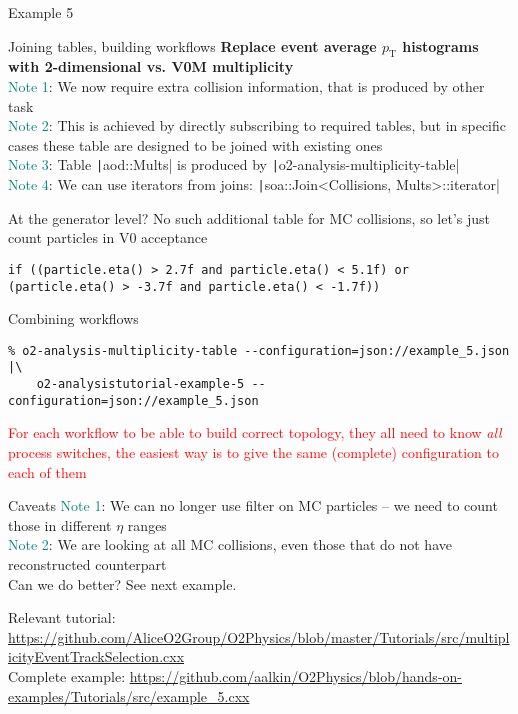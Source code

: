 \documentclass[10pt,lualatex,xcolor={table,svgnames},{hyperref={bookmarks=true,linktoc=all}},aspectratio=169]{beamer}
\newcommand{\programmatic}[1]{\textcolor{-green!40!yellow}{#1}}
\newcommand{\notion}[1]{\textcolor{teal}{#1}}
\newcommand{\codeline}[1]{{\texttt|#1|}}
\begin{document}
\begin{frame}{Example 5}
\begin{block}{Joining tables, building workflows}
\textbf{Replace event average $p_{\text{T}}$ histograms with 2-dimensional vs. V0M multiplicity}\\[1em]

\notion{Note 1}: We now require extra collision information, that is produced by other task \\
\notion{Note 2}: This is achieved by directly subscribing to required tables, but in specific cases these table are designed to be \programmatic{joined} with existing ones \\
\notion{Note 3}: Table \codeline{aod::Mults} is produced by \codeline{o2-analysis-multiplicity-table} \\
\notion{Note 4}: We can use iterators from joins: \codeline{soa::Join<Collisions, Mults>::iterator}
\end{block}

\begin{block}{At the generator level?}
No such additional table for MC collisions, so let's just count particles in V0 acceptance
\begin{verbatim}
if ((particle.eta() > 2.7f and particle.eta() < 5.1f) or (particle.eta() > -3.7f and particle.eta() < -1.7f))
\end{verbatim}
\end{block}
\framebreak
\begin{block}{Combining workflows}
\begin{verbatim}
% o2-analysis-multiplicity-table --configuration=json://example_5.json |\
    o2-analysistutorial-example-5 --configuration=json://example_5.json
\end{verbatim}

\textcolor{red}{For each workflow to be able to build correct topology, they all need to know \emph{all} process switches, the easiest way is to give the same (complete) configuration to each of them}
\vspace{0.2ex}
\end{block}
\begin{block}{Caveats}
\notion{Note 1}: We can no longer use filter on MC particles -- we need to count those in different $\eta$ ranges \\
\notion{Note 2}: We are looking at all MC collisions, even those that do not have reconstructed counterpart \\

Can we do better? See next example.
\end{block}

{\footnotesize Relevant tutorial:  \href{https://github.com/AliceO2Group/O2Physics/blob/master/Tutorials/src/multiplicityEventTrackSelection.cxx}{https://github.com/AliceO2Group/O2Physics/blob/master/Tutorials/src/multiplicityEventTrackSelection.cxx} \\
    Complete example: \href{https://github.com/aalkin/O2Physics/blob/hands-on-examples/Tutorials/src/example_5.cxx}{https://github.com/aalkin/O2Physics/blob/hands-on-examples/Tutorials/src/example\_5.cxx}
}
\end{frame}
\end{document}
